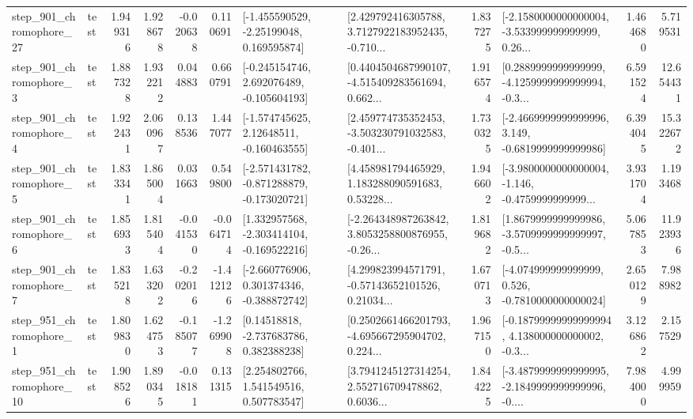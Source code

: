 \begin{tabular}{llrrrrllrlrr}
  step\_901\_chromophore\_27 &      test &      1.949316 &    1.928678 &     -0.020638 &  0.110691 &    [-1.455590529, -2.25199048, 0.169595874] &  [2.429792416305788, 3.7127922183952435, -0.710... &       1.837275 &  [-2.1580000000000004, -3.533999999999999, 0.26... &            1.464680 &          5.719531 \\
   step\_901\_chromophore\_3 &      test &      1.887328 &    1.932212 &      0.044883 &  0.660791 &   [-0.245154746, 2.692076489, -0.105604193] &  [0.4404504687990107, -4.515409283561694, 0.662... &       1.916574 &  [0.2889999999999999, -4.1259999999999994, -0.3... &            6.591524 &         12.654431 \\
   step\_901\_chromophore\_4 &      test &      1.922431 &    2.060967 &      0.138536 &  1.447077 &    [-1.574745625, 2.12648511, -0.160463555] &  [2.459774735352453, -3.503230791032583, -0.401... &       1.730325 &  [-2.4669999999999996, 3.149, -0.6819999999999986] &            6.394045 &         15.322672 \\
   step\_901\_chromophore\_5 &      test &      1.833341 &    1.865004 &      0.031663 &  0.549800 &  [-2.571431782, -0.871288879, -0.173020721] &  [4.458981794465929, 1.183288090591683, 0.53228... &       1.946602 &  [-3.9800000000000004, -1.146, -0.4759999999999... &            3.931704 &          1.193468 \\
   step\_901\_chromophore\_6 &      test &      1.856933 &    1.815404 &     -0.041530 & -0.064714 &   [1.332957568, -2.303414104, -0.169522216] &  [-2.264348987263842, 3.8053258800876955, -0.26... &       1.819682 &  [1.8679999999999986, -3.5709999999999997, -0.5... &            5.067853 &         11.923936 \\
   step\_901\_chromophore\_7 &      test &      1.835218 &    1.633202 &     -0.202016 & -1.412126 &   [-2.660776906, 0.301374346, -0.388872742] &  [4.299823994571791, -0.57143652101526, 0.21034... &       1.670713 &   [-4.074999999999999, 0.526, -0.7810000000000024] &            2.650129 &          7.988982 \\
   step\_951\_chromophore\_1 &      test &      1.809830 &    1.624753 &     -0.185077 & -1.269908 &     [0.14518818, -2.737683786, 0.382388238] &  [0.2502661466201793, -4.695667295904702, 0.224... &       1.967150 &  [-0.18799999999999994, 4.138000000000002, -0.3... &            3.126862 &          2.157529 \\
  step\_951\_chromophore\_10 &      test &      1.908526 &    1.890345 &     -0.018181 &  0.131315 &     [2.254802766, 1.541549516, 0.507783547] &  [3.7941245127314254, 2.552716709478862, 0.6036... &       1.844225 &  [-3.4879999999999995, -2.1849999999999996, -0.... &            7.984000 &          4.999959 \\

\end{tabular}
